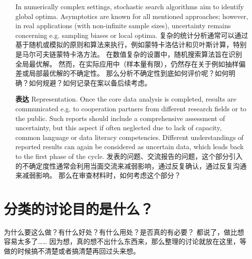 \documentclass[a4paper]{ctexart}
\begin{document}
\begin{itemize}
            In numerically complex settings, stochastic search algorithms aim to identify global optima. Asymptotics are known for all mentioned approaches; however, in real applications (with non-infinite sample sizes), uncertainty remains concerning e.g. sampling biases or local optima.
            复杂的统计分析通常可以通过基于随机或模拟的原则和算法来执行，例如蒙特卡洛估计和贝叶斯计算，特别是马尔可夫链蒙特卡洛方法。
            在数值复杂的设置中，随机搜索算法旨在识别全局最优解。
            然而，在实际应用中（样本量有限），仍然存在关于例如抽样偏差或局部最优解的不确定性。
            那么分析不确定性到底如何评价呢？如何明确？如何规避？如何记录在案以备后续考虑。
      \item[\textbf{表达}] Representation.
            Once the core data analysis is completed, results are communicated e.g. to cooperation partners from different research fields or to the public.
            Such reports should include a comprehensive assessment of uncertainty, but this aspect if often neglected due to lack of capacity, common language or data literacy competencies.
            Different understandings of reported results can again be considered as uncertain data, which leads back to the first phase of the cycle.
            发表的问题、交流报告的问题，这个部分引入的不确定度性通常会利用当面交流来减弱影响，通过反复确认，通过反复沟通来减弱影响。
            那么在审查材料时，如何考虑这个部分？
\end{itemize}

\section{分类的讨论目的是什么？}
为什么要这么做？有什么好处？有什么用处？是否真的有必要？
都说了，做比想容易太多了……
因为想，真的想不出什么东西来，那么整理的讨论就放在这里，等做的时候搞不清楚或者搞清楚再回过头来想。
\end{document}
